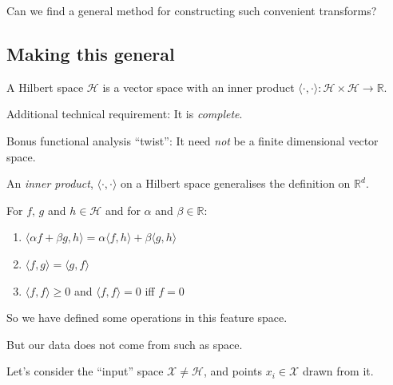 Can we find a general method for constructing such convenient transforms?
\clearpage
\subsection*{Making this general}

\begin{defn}
A Hilbert space $\mathcal{H}$ is a vector space with an inner product $\langle\cdot,\cdot\rangle: \mathcal{H}\times\mathcal{H} \rightarrow\mathbb{R}$.
\end{defn}

Additional technical requirement: It is \emph{complete}.

Bonus functional analysis ``twist'': It need \emph{not} be a finite dimensional vector space.
\clearpage
\begin{defn}
An \emph{inner product}, $\langle\cdot,\cdot\rangle$ on a Hilbert space generalises the definition on $\mathbb{R}^d$.

For $f,\,g$ and $h \in \mathcal{H}$ and for $\alpha$ and $\beta \in \mathbb{R}$:
\begin{enumerate}
\item $\langle\alpha f + \beta g, h\rangle = \alpha\langle f, h\rangle + \beta\langle g, h\rangle$
\item $\langle f, g\rangle = \langle g, f \rangle$
\item $\langle f, f \rangle \ge 0$ and $\langle f, f\rangle = 0$ iff $f =0$
\end{enumerate}
\end{defn}

\clearpage

So we have defined some operations in this feature space.

But our data does not come from such as space.

Let's consider the ``input'' space $\mathcal{X}\ne\mathcal{H}$, and points $x_i \in \mathcal{X}$ drawn from it.

